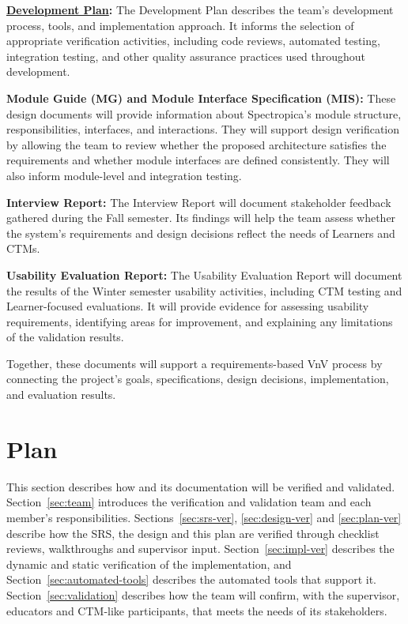 \documentclass[12pt, titlepage]{article}
\newcounter{validation}
\begin{document}
\textbf{\href{https://github.com/meena-alomran/game-n-grow/blob/main/pdfs/DevelopmentPlan/DevelopmentPlan.pdf}{Development
Plan}:} The Development Plan describes the team's development process, tools,
and implementation approach. It informs the selection of appropriate
verification activities, including code reviews, automated testing, integration
testing, and other quality assurance practices used throughout development.

\textbf{Module Guide (MG) and Module Interface Specification (MIS):} These
design documents will provide information about Spectropica's module structure,
responsibilities, interfaces, and interactions. They will support design
verification by allowing the team to review whether the proposed architecture
satisfies the requirements and whether module interfaces are defined
consistently. They will also inform module-level and integration testing.

\textbf{Interview Report:} The Interview Report will document stakeholder
feedback gathered during the Fall semester. Its findings will help the team
assess whether the system's requirements and design decisions reflect the needs
of Learners and CTMs.

\textbf{Usability Evaluation Report:} The Usability Evaluation Report will
document the results of the Winter semester usability activities, including CTM
testing and Learner-focused evaluations. It will provide evidence for assessing
usability requirements, identifying areas for improvement, and explaining any
limitations of the validation results.

Together, these documents will support a requirements-based VnV process by
connecting the project's goals, specifications, design decisions,
implementation, and evaluation results.

\section{Plan}

This section describes how \progname{} and its documentation will be verified and validated. Section~\ref{sec:team} introduces the verification and validation team and each member's responsibilities. Sections~\ref{sec:srs-ver}, \ref{sec:design-ver} and \ref{sec:plan-ver} describe how the SRS, the design and this plan are verified through checklist reviews, walkthroughs and supervisor input. Section~\ref{sec:impl-ver} describes the dynamic and static verification of the implementation, and Section~\ref{sec:automated-tools} describes the automated tools that support it. Section~\ref{sec:validation} describes how the team will confirm, with the supervisor, educators and CTM-like participants, that \progname{} meets the needs of its stakeholders.
\end{document}
